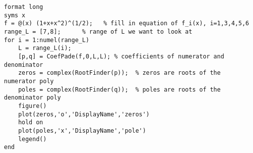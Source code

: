 \lstset{basicstyle=\footnotesize,style=myCustomMatlabStyle}
\begin{lstlisting}
format long
syms x
f = @(x) (1+x+x^2)^(1/2);   % fill in equation of f_i(x), i=1,3,4,5,6
range_L = [7,8];      % range of L we want to look at
for i = 1:numel(range_L)    
    L = range_L(i);
    [p,q] = CoefPade(f,0,L,L); % coefficients of numerator and denominator
    zeros = complex(RootFinder(p));  % zeros are roots of the numerator poly
    poles = complex(RootFinder(q));  % poles are roots of the denominator poly
    figure()
    plot(zeros,'o','DisplayName','zeros')
    hold on
    plot(poles,'x','DisplayName','pole')
    legend()
end

\end{lstlisting}